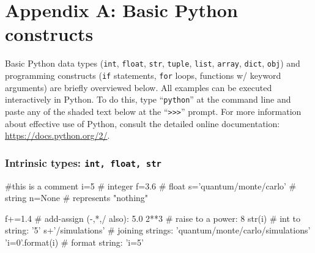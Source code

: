 
\section{Appendix A: Basic Python constructs\label{app:python_basics}}
Basic Python data types (\texttt{int}, \texttt{float}, \texttt{str}, \texttt{tuple}, \texttt{list}, \texttt{array}, \texttt{dict}, \texttt{obj}) and programming constructs (\texttt{if} statements, \texttt{for} loops, functions w/ keyword arguments) are briefly overviewed below.  All examples can be executed interactively in Python.  To do this, type ``\texttt{python}'' at the command line and paste any of the shaded text below at the ``\texttt{>>>}'' prompt.  For more information about effective use of Python, consult the detailed online documentation: \href{https://docs.python.org/2/}{https://docs.python.org/2/}.

\subsubsection{Intrinsic types: \texttt{int, float, str}}
\begin{shade}
#this is a comment
i=5                     # integer
f=3.6                   # float
s='quantum/monte/carlo' # string
n=None                  # represents "nothing"

f+=1.4                  # add-assign (-,*,/ also): 5.0
2**3                    # raise to a power: 8
str(i)                  # int to string: '5'
s+'/simulations'        # joining strings: 'quantum/monte/carlo/simulations'
'i={0}'.format(i)       # format string: 'i=5'

\end{shade}

 
